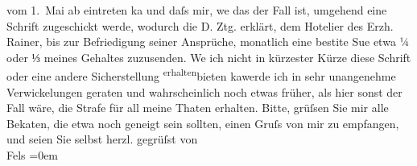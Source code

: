 \begin{ledgroupsized}[t]{13cm}
                    vom 1. Mai ab eintreten ka{\geminationn} und  daſs mir, we{\geminationn}
                    das der Fall ist, umgehend eine Schrift zugeschickt werde, wodurch die D. Ztg. erklärt, dem Hotelier des Erzh. Rainer, bis zur Befriedigung seiner Ansprüche,
                    monatlich eine besti{\geminationm}te Su{\geminationm}e etwa ¼ \introOben{}oder ⅓\introOben{} meines
                    Gehaltes zuzusenden. We{\geminationn} ich nicht in kürzester
                    Kürze diese Schrift oder eine andere Sicherstellung \substVorne{}\textsuperscript{erhalten}{\allowbreak}\substDazwischen{}bieten ka{\geminationn}\substHinten{}{ }{\pb}werde ich in sehr unangenehme
                    Verwickelungen geraten und wahrscheinlich noch etwas früher, als hier sonst der
                    Fall wäre, die Strafe für all meine Thaten erhalten.\pend
           \pstart
           Bitte, grüſsen Sie mir alle Beka{\geminationn}ten, die etwa noch
                    geneigt sein sollten, einen Gruſs von mir zu empfangen, und seien Sie selbst
                    herzl. gegrüſst\pend
           \pstart
           von{\\[\baselineskip]}\spacefill\mbox{Fels}\pend
           \leftskip=0em{}\endnumbering{}\end{ledgroupsized}  \newcommand{\dateiname}{L00198}\newcommand{\titel}{Friedrich M. Fels an Arthur Schnitzler, 20. 4. 1893}\newcommand{\editorInnen}{Martin Anton Müller und Gerd-Hermann Susen}
      